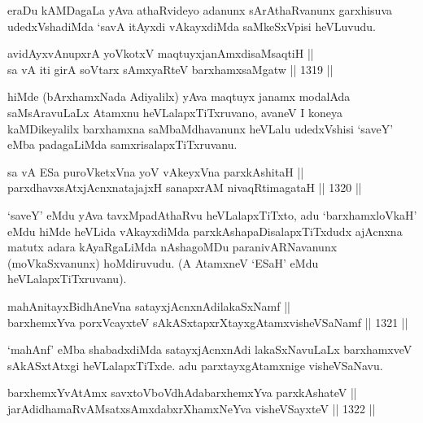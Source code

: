 \begin{artha}
eraDu kAMDagaLa yAva athaRvideyo adanunx sArAthaRvanunx garxhisuva udedxVshadiMda `savA itAyxdi vAkayxdiMda saMkeSxVpisi heVLuvudu.
\end{artha}


\begin{shl}
avidAyxvAnupxrA yoVkotxV maqtuyxjanAmxdisaMsaqtiH || \\
sa vA iti girA soV\s tarx sAmxyaRteV barxhamxsaMgatw ||  1319 ||  
\end{shl}

\begin{artha}
hiMde (bArxhamxNada Adiyalilx) yAva maqtuyx janamx modalAda saMsAravuLaLx Atamxnu heVLalapxTiTxruvano, avaneV I koneya kaMDikeyalilx barxhamxna saMbaMdhavanunx heVLalu udedxVshisi `saveY' eMba padagaLiMda samxrisalapxTiTxruvanu.
\end{artha}


\begin{shl}
sa vA ESa puroVketxVna yoV vAkeyxVna parxkAshitaH || \\
parxdhavxsAtxjAcnxnatajajxH sanapxrAM nivaqRtimagataH ||  1320 ||  
\end{shl}

\begin{artha}
`saveY' eMdu yAva tavxMpadAthaRvu heVLalapxTiTxto, adu `barxhamxloVkaH' eMdu hiMde heVLida vAkayxdiMda parxkAshapaDisalapxTiTxdudx ajAcnxna matutx adara kAyaRgaLiMda nAshagoMDu paranivARNavanunx (moVkaSxvanunx) hoMdiruvudu. (A AtamxneV `ESaH' eMdu heVLalapxTiTxruvanu).
\end{artha}

\begin{shl}
mahAnitayxBidhAneVna satayxjAcnxnAdilakaSxNamf ||  \\
barxhemxYva porxVcayxteV sAkASxtapxrXtayxgAtamxvisheVSaNamf ||  1321 ||  
\end{shl}

\begin{artha}
`mahAnf' eMba shabadxdiMda satayxjAcnxnAdi lakaSxNavuLaLx barxhamxveV sAkASxtAtxgi heVLalapxTiTxde. adu parxtayxgAtamxnige visheVSaNavu.
\end{artha}


\begin{shl}
barxhemxYvA\s \s tAmx savxtoV\s boVdhAdabarxhemxYva parxkAshateV || \\
jarAdidhamaRvAMsatxsAmxdabxrXhamxNeYva visheVSayxteV ||  1322 ||  
\end{shl}

